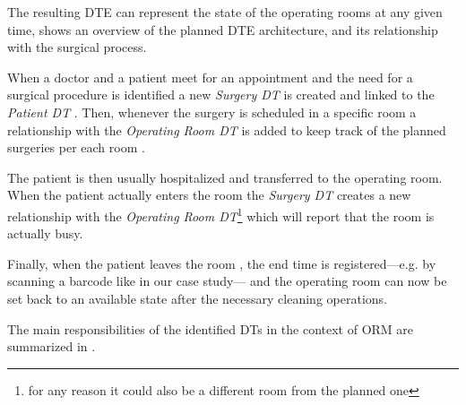 The resulting \ac{DTE} can represent the state of the operating rooms at any given time,  shows an overview of the planned \ac{DTE} architecture, and its relationship with the surgical process.

When a doctor and a patient meet for an appointment and the need for a surgical procedure is identified  a new \textit{Surgery DT} is created  and linked to the \emph{Patient DT} . 
%
Then, whenever the surgery is scheduled in a specific room  a relationship with the \emph{Operating Room DT} is added to keep track of the planned surgeries per each room .

The patient is then usually hospitalized and transferred to the operating room. When the patient actually enters the room the \textit{Surgery DT} creates a new relationship with the \emph{Operating Room DT}\footnote{for any reason it could also be a different room from the planned one}  which will report that the room is actually busy.

Finally, when the patient leaves the room , the end time is registered---e.g. by scanning a barcode like in our case study--- and the operating room can now be set back to an available state after the necessary cleaning operations.


The main responsibilities of the identified \acp{DT} in the context of ORM are summarized in .

